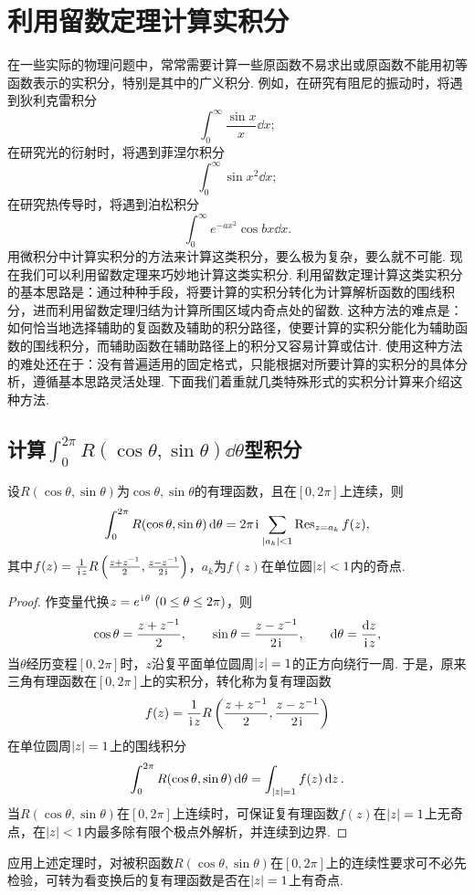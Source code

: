 \section{利用留数定理计算实积分}
在一些实际的物理问题中，常常需要计算一些原函数不易求出或原函数不能用初等函数表示的实积分，特别是其中的广义积分.
例如，在研究有阻尼的振动时，将遇到狄利克雷积分\[
\int_0^\infty \frac{\sin x}{x} \dd{x};
\]在研究光的衍射时，将遇到菲涅尔积分\[
\int_0^\infty \sin x^2 \dd{x};
\]在研究热传导时，将遇到泊松积分\[
\int_0^\infty e^{-ax^2} \cos bx \dd{x}.
\]用微积分中计算实积分的方法来计算这类积分，要么极为复杂，要么就不可能.
现在我们可以利用留数定理来巧妙地计算这类实积分.
利用留数定理计算这类实积分的基本思路是：通过种种手段，将要计算的实积分转化为计算解析函数的围线积分，进而利用留数定理归结为计算所围区域内奇点处的留数.
这种方法的难点是：如何恰当地选择辅助的复函数及辅助的积分路径，使要计算的实积分能化为辅助函数的围线积分，而辅助函数在辅助路径上的积分又容易计算或估计.
使用这种方法的难处还在于：没有普遍适用的固定格式，只能根据对所要计算的实积分的具体分析，遵循基本思路灵活处理.
下面我们着重就几类特殊形式的实积分计算来介绍这种方法.

\subsection{计算\texorpdfstring{\(\int_0^{2\pi} R(\cos\theta,\sin\theta) \dd{\theta}\)型}{在[0,2π]区间上的含有三角函数的}积分}
\begin{theorem}\label{theorem:留数定理.利用留数定理计算实积分1}
设\(R(\cos\theta,\sin\theta)\)为\(\cos\theta,\sin\theta\)的有理函数，且在\([0,2\pi]\)上连续，则\[
\int_0^{2\pi} R(\cos\theta,\sin\theta) \dd{\theta}
= 2\pi\kern1pt\mathrm{i}\kern1pt \sum\limits_{\abs{a_k}<1} \operatorname{Res}_{z=a_k} f(z),
\]其中\(f(z) = \frac{1}{\kern1pt\mathrm{i}\kern1pt z} R\left(\frac{z+z^{-1}}{2},\frac{z-z^{-1}}{2\kern1pt\mathrm{i}\kern1pt}\right)\)，\(a_k\)为\(f(z)\)在单位圆\(\abs{z}<1\)内的奇点.
\begin{proof}
作变量代换\(z = e^{\kern1pt\mathrm{i}\kern1pt\theta}\ (0\leq\theta\leq2\pi)\)，则\[
\cos\theta = \frac{z+z^{-1}}{2},
\qquad
\sin\theta = \frac{z-z^{-1}}{2\kern1pt\mathrm{i}\kern1pt},
\qquad
\dd{\theta} = \frac{\dd{z}}{\kern1pt\mathrm{i}\kern1pt z},
\]当\(\theta\)经历变程\([0,2\pi]\)时，\(z\)沿复平面单位圆周\(\abs{z}=1\)的正方向绕行一周.
于是，原来三角有理函数在\([0,2\pi]\)上的实积分，转化称为复有理函数\[
f(z) = \frac{1}{\kern1pt\mathrm{i}\kern1pt z} R\left(\frac{z+z^{-1}}{2},\frac{z-z^{-1}}{2\kern1pt\mathrm{i}\kern1pt}\right)
\]在单位圆周\(\abs{z}=1\)上的围线积分\[
\int_0^{2\pi} R(\cos\theta,\sin\theta) \dd{\theta}
= \int_{\abs{z}=1} f(z) \dd{z}.
\]当\(R(\cos\theta,\sin\theta)\)在\([0,2\pi]\)上连续时，可保证复有理函数\(f(z)\)在\(\abs{z}=1\)上无奇点，在\(\abs{z}<1\)内最多除有限个极点外解析，并连续到边界.
\end{proof}
\end{theorem}
应用上述定理时，对被积函数\(R(\cos\theta,\sin\theta)\)在\([0,2\pi]\)上的连续性要求可不必先检验，可转为看变换后的复有理函数是否在\(\abs{z}=1\)上有奇点.

